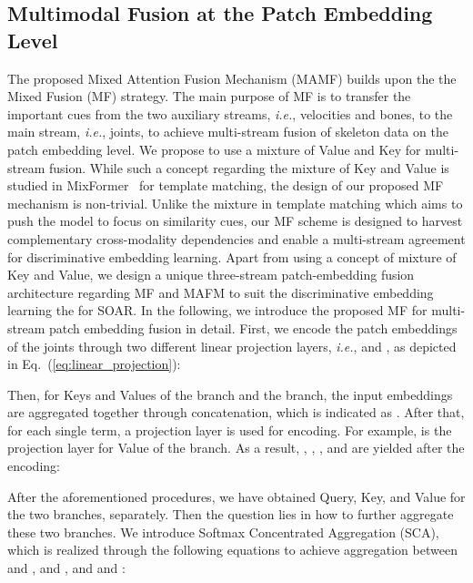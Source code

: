 \documentclass[lettersize,journal]{IEEEtran}
\begin{document}
\subsection{Multimodal Fusion at the Patch Embedding Level}
\label{sec:MAFM}
The proposed Mixed Attention Fusion Mechanism (MAMF) builds upon the the Mixed Fusion (MF) strategy.
The main purpose of MF is to transfer the important cues from the two auxiliary streams, \textit{i.e.}, velocities and bones, to the main stream, \textit{i.e.}, joints, to achieve multi-stream fusion of skeleton data on the patch embedding level. We propose to use a mixture of Value and Key for multi-stream fusion. While such a concept regarding the mixture of Key and Value is studied in MixFormer~\cite{cui2022mixformer} for template matching, the design of our proposed MF mechanism is non-trivial. Unlike the mixture in template matching which aims to push the model to focus on similarity cues, our MF scheme is designed to harvest complementary cross-modality dependencies and enable a multi-stream agreement for discriminative embedding learning. Apart from using a concept of mixture of Key and Value, we design a unique three-stream patch-embedding fusion architecture regarding MF and MAFM to suit the discriminative embedding learning the for SOAR.
In the following, we introduce the proposed MF for multi-stream patch embedding fusion in detail.
First, we encode the patch embeddings of the joints  through two different linear projection layers, \textit{i.e.},  and , as depicted in Eq.~(\ref{eq:linear_projection}):

Then, for Keys and Values of the  branch and the  branch, the input embeddings are aggregated together through concatenation, which is indicated as .
After that, for each single term, a projection layer is used for encoding.
For example,  is the projection layer for Value of the  branch.
As a result, , , , and  are yielded after the encoding:




After the aforementioned procedures, we have obtained Query, Key, and Value for the two branches, separately.
Then the question lies in how to further aggregate these two branches.
We introduce Softmax Concentrated Aggregation (SCA), which is realized through the following equations to achieve aggregation between  and ,  and , and  and :
\end{document}
